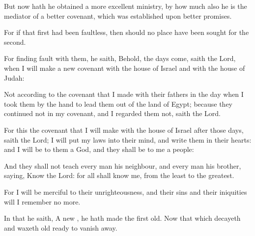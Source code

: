 {But
now hath he obtained
a more
excellent
ministry, by how
much
also he
is the
mediator of a
better
covenant,
which was
established
upon
better
promises.

For
if
that
first
{} had
been
faultless, then should
no
place have been
sought for the
second.

For finding
fault with
them, he
saith,
Behold, the
days
come,
saith the
Lord,
when I will
make
a
new
covenant
with the
house of
Israel
and
with the
house of
Judah:

Not according
to the
covenant
that I
made
with
their
fathers
in the
day
when
I
took
them by the
hand to
lead
them
out
of the
land of
Egypt;
because
they
continued
not
in
my
covenant, and
I
regarded
them
not,
saith the
Lord.

For
this
{} the
covenant
that I will
make with the
house of
Israel
after
those
days,
saith the
Lord; I
will
put
my
laws
into
their
mind,
and
write
them
in
their
hearts:
and I will
be to
them a
God,
and
they shall
be to
me a
people:

And they
shall
not
teach every
man
his
neighbour,
and every
man
his
brother,
saying,
Know the
Lord:
for
all shall
know
me,
from the
least
to the
greatest.

For I will
be
merciful
to
their
unrighteousness,
and
their
sins
and
their
iniquities will I
remember
no
more.

In that he
saith, A
new
{}, he hath
made the
first
old.
Now that which
decayeth
and waxeth
old
{}
ready to vanish
away.




\par }
